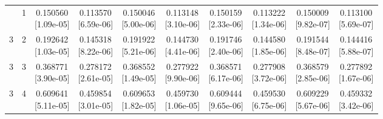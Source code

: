 \documentclass[12pt,letterpaper]{article}
\theoremstyle{plain}
\theoremstyle{definition}
\begin{document}
\begin{table}[p]
\begin{adjustbox}{max width=\linewidth}
\begin{tabular}{@{}rr*{8}{c}@{}}
\addlinespace[2pt]
3 & 1 & \shortstack{0.150560\\[-1pt]{\scriptsize[1.09e-05]}} & \shortstack{0.113570\\[-1pt]{\scriptsize[6.59e-06]}} & \shortstack{0.150046\\[-1pt]{\scriptsize[5.00e-06]}} & \shortstack{0.113148\\[-1pt]{\scriptsize[3.10e-06]}} & \shortstack{0.150159\\[-1pt]{\scriptsize[2.33e-06]}} & \shortstack{0.113222\\[-1pt]{\scriptsize[1.34e-06]}} & \shortstack{0.150009\\[-1pt]{\scriptsize[9.82e-07]}} & \shortstack{0.113100\\[-1pt]{\scriptsize[5.69e-07]}}\\
3 & 2 & \shortstack{0.192642\\[-1pt]{\scriptsize[1.03e-05]}} & \shortstack{0.145318\\[-1pt]{\scriptsize[8.22e-06]}} & \shortstack{0.191922\\[-1pt]{\scriptsize[5.21e-06]}} & \shortstack{0.144730\\[-1pt]{\scriptsize[4.41e-06]}} & \shortstack{0.191746\\[-1pt]{\scriptsize[2.40e-06]}} & \shortstack{0.144580\\[-1pt]{\scriptsize[1.85e-06]}} & \shortstack{0.191544\\[-1pt]{\scriptsize[8.48e-07]}} & \shortstack{0.144416\\[-1pt]{\scriptsize[5.88e-07]}}\\
3 & 3 & \shortstack{0.368771\\[-1pt]{\scriptsize[3.90e-05]}} & \shortstack{0.278172\\[-1pt]{\scriptsize[2.61e-05]}} & \shortstack{0.368552\\[-1pt]{\scriptsize[1.49e-05]}} & \shortstack{0.277922\\[-1pt]{\scriptsize[9.90e-06]}} & \shortstack{0.368571\\[-1pt]{\scriptsize[6.17e-06]}} & \shortstack{0.277908\\[-1pt]{\scriptsize[3.72e-06]}} & \shortstack{0.368579\\[-1pt]{\scriptsize[2.85e-06]}} & \shortstack{0.277892\\[-1pt]{\scriptsize[1.67e-06]}}\\
3 & 4 & \shortstack{0.609641\\[-1pt]{\scriptsize[5.11e-05]}} & \shortstack{0.459854\\[-1pt]{\scriptsize[3.01e-05]}} & \shortstack{0.609653\\[-1pt]{\scriptsize[1.82e-05]}} & \shortstack{0.459730\\[-1pt]{\scriptsize[1.06e-05]}} & \shortstack{0.609444\\[-1pt]{\scriptsize[9.65e-06]}} & \shortstack{0.459530\\[-1pt]{\scriptsize[6.75e-06]}} & \shortstack{0.609229\\[-1pt]{\scriptsize[5.67e-06]}} & \shortstack{0.459332\\[-1pt]{\scriptsize[3.42e-06]}}\\

\end{tabular}
\end{adjustbox}
\end{table}
\end{document}
